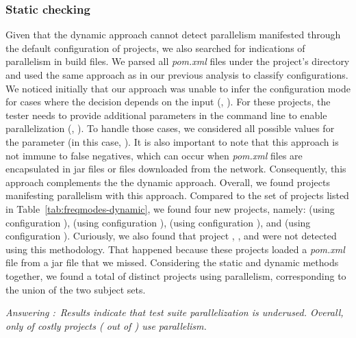 \documentclass[10pt,journal,compsoc]{IEEEtran}
\begin{document}
\subsubsection{Static checking}
\label{sec:rqC-2}
Given that the dynamic approach cannot detect parallelism manifested
through the default
configuration of projects, we also searched for indications of parallelism in build
files.  We
parsed all \emph{pom.xml} files under the project's directory and used
the same approach as in our previous analysis to classify
configurations.  We noticed initially that our approach was unable to
infer the configuration mode for cases where the decision depends on
the input (\eg,
). For these
projects, the tester needs to provide additional parameters in the
command line to enable parallelization (\eg, ). To handle those cases, we
considered all possible values for the parameter (in this case,
).  It is also important to note that this
approach is not immune to false negatives, which can occur when
\emph{pom.xml} files are encapsulated in jar files or files downloaded from
the network.  Consequently, this approach complements the
the dynamic approach. Overall, we found \numProjectsParStatic{}
projects manifesting parallelism with this approach.
Compared to the set of projects listed in
Table~\ref{tab:freqmodes-dynamic}, we found four new projects, namely:
 (using
configuration \ParClassParMeth),  (using configuration
\ForkSeq{}),  (using configuration \ForkSeq), and
 (using configuration \ParClassParMeth).
Curiously, we also found that project , ,
and  were not detected using this methodology.
That happened because these projects loaded a \emph{pom.xml} file from
a jar file that we missed.
Considering the static and dynamic methods together, we found a total
of \numProjectsParTotal{} distinct projects using parallelism,
corresponding to the union of the two subject sets.

\begin{mdframed}
  \noindent\textit{Answering \numRQAdoptionOne{}:}~\emph{Results indicate that test
  suite parallelization is underused.  Overall, only
  \percentParallel{} of costly projects (\numProjectsParTotal{} out of \numMedLong)
  use parallelism.}
\end{mdframed}
\end{document}
